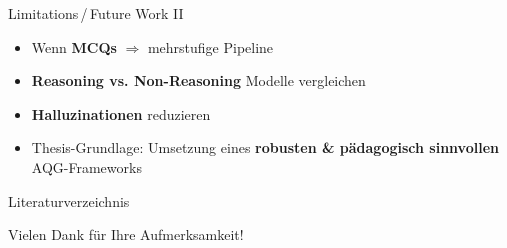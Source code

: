 \documentclass[usenames, dvipsnames, aspectratio=32]{beamer}
\begin{document}
\begin{frame}{Limitations\,/\,Future Work II}
    \begin{itemize}
        \item Wenn \textbf{MCQs} $\Rightarrow$ mehrstufige Pipeline 
        \item \textbf{Reasoning vs. Non-Reasoning} Modelle vergleichen
        \item \textbf{Halluzinationen} reduzieren 
        \item Thesis-Grundlage: Umsetzung eines \textbf{robusten \& pädagogisch sinnvollen} AQG-Frameworks
    \end{itemize}
\end{frame}

\appendix
{}
\begin{frame}[allowframebreaks]{Literaturverzeichnis}
    \printbibliography[heading=none]
\end{frame}

\begin{frame}
    \centering
    \vspace{1em}
    \huge \textcolor{Black!80}{Vielen Dank für Ihre Aufmerksamkeit!}
\end{frame}
\end{document}
